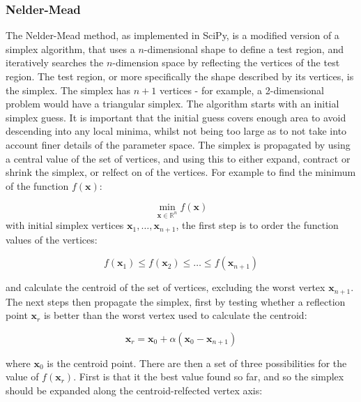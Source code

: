 \subsubsection{Nelder-Mead}
\label{nelder_mead}
The Nelder-Mead method, as implemented in SciPy, is a modified version of a simplex
algorithm, that uses a $n$-dimensional shape to define a test region, and iteratively
searches the $n$-dimension space by reflecting the vertices of the test region. 
The test region, or more specifically the shape described by its vertices, is the
simplex. The simplex has $n+1$ vertices - for example, a 2-dimensional problem
would have a triangular simplex.
The algorithm starts with an initial simplex guess. It is important that the initial
guess covers enough area to avoid descending into any local minima, whilst not being
too large as to not take into account finer details of the parameter space.
The simplex is propagated by using a central value of the set of vertices, and using
this to either expand, contract or shrink the simplex, or relfect on of the vertices.
For example to find the minimum of the function $f\left(\mathbf{x}\right)$:

\begin{equation}
\min_{\mathbf{x} \in \mathbb{R}^n} f\left( \mathbf{x} \right)
\end{equation}
with initial simplex vertices $\mathbf{x}_1, \dots, \mathbf{x}_{n+1}$,
the first step is to order the function values of the vertices:

\begin{equation}
f\left(\mathbf{x}_1\right) \leq f\left(\mathbf{x}_2\right) \leq \dots \leq f\left(\mathbf{x}_{n+1}\right)
\end{equation}

and calculate the centroid of the set of vertices, excluding the worst vertex 
$\mathbf{x}_{n+1}$. The next steps then propagate the simplex, first by testing 
whether a reflection point $\mathbf{x}_r$ is better than the worst vertex used to
calculate the centroid:

\begin{equation}
\mathbf{x}_r = \mathbf{x}_0 + \alpha\left(\mathbf{x}_0 - \mathbf{x}_{n+1}\right) 
\end{equation}

where $\mathbf{x}_0$ is the centroid point. There are then a set of three possibilities
for the value of $f\left(\mathbf{x}_r\right)$. First is that it the best value
found so far, and so the simplex should be expanded along the centroid-relfected 
vertex axis:

